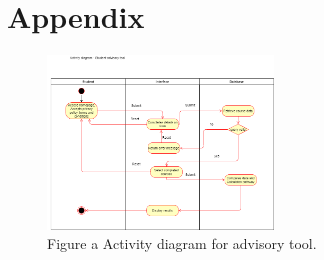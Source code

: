 \documentclass[12pt]{article}
\begin{document}
\section*{Appendix}
\begin{figure}[h]
\centering
\includegraphics[width=6cm]{./ActivityDiagram.png}\\
Figure a Activity diagram for advisory tool.
\end{figure}



\begin{figure}[h]
\centering
\label{fig:comms}
\end{figure}
\end{document}

